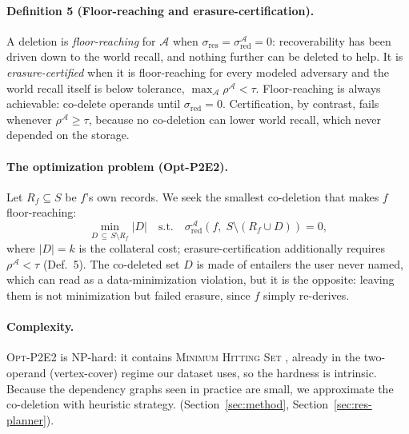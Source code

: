 \documentclass[letterpaper]{article}
\begin{document}
\paragraph{Definition 5 (Floor-reaching and erasure-certification).}
A deletion is \emph{floor-reaching} for $\mathcal{A}$ when
$\sigma_{\mathrm{res}}=\sigma_{\mathrm{red}}^{\mathcal{A}}=0$: recoverability has
been driven down to the world recall, and nothing further can be deleted to
help. It is \emph{erasure-certified} when it is floor-reaching for every modeled
adversary and the world recall itself is below tolerance,
$\max_{\mathcal{A}}\rho^{\mathcal{A}}<\tau$. 
Floor-reaching is always achievable: co-delete operands until
$\sigma_{\mathrm{red}}=0$. Certification, by contrast, fails whenever
$\rho^{\mathcal{A}}\geq\tau$, because no co-deletion can lower world recall, which never
depended on the storage.

\paragraph{The optimization problem (Opt-P2E2).} Let $R_f\subseteq S$ be $f$'s own
records. We seek the smallest co-deletion that makes $f$ floor-reaching:
\begin{equation*}
\min_{D\,\subseteq\, S\setminus R_f} |D| \quad\text{s.t.}\quad
\sigma_{\mathrm{red}}^{\mathcal{A}}\!\left(f,\; S\setminus(R_f\cup D)\right) = 0 ,
\end{equation*}
where $|D|=k$ is the collateral cost; erasure-certification additionally requires
$\rho^{\mathcal{A}}<\tau$ (Def.~5). The co-deleted set $D$ is made of entailers the
user never named, which can read as a data-minimization violation, but it is the
opposite: leaving them is not minimization but failed erasure, since $f$ simply
re-derives.

\paragraph{Complexity.} \textsc{Opt-P2E2} is NP-hard: it contains \textsc{Minimum
Hitting Set} \citep{p2e2,karp1972reducibility,garey1979computers}, already in the
two-operand (vertex-cover) regime our dataset uses, so the hardness is intrinsic. 
Because the dependency graphs seen in practice are small, we approximate the 
co-deletion with heuristic strategy.
(Section~\ref{sec:method}, Section~\ref{sec:res-planner}).
\end{document}

